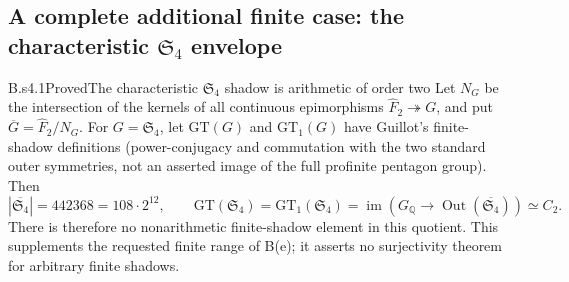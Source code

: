 \subsection{A complete additional finite case: the characteristic $\mathfrak S_4$ envelope}

\begin{claim}{B.s4.1}{Proved}{The characteristic $\mathfrak S_4$ shadow is arithmetic of order two}
Let $N_G$ be the intersection of the kernels of all continuous epimorphisms
$\widehat F_2\twoheadrightarrow G$, and put $\overline G=\widehat F_2/N_G$.
For $G=\mathfrak S_4$, let $\mathrm{GT}(G)$ and $\mathrm{GT}_1(G)$ have
Guillot's finite-shadow definitions (power-conjugacy and commutation with the
two standard outer symmetries, not an asserted image of the full profinite
pentagon group). Then
\[
 |\overline{\mathfrak S_4}|=442368=108\cdot2^{12},\qquad
 \mathrm{GT}(\mathfrak S_4)=\mathrm{GT}_1(\mathfrak S_4)
       =\operatorname{im}(G_{\mathbb Q}\to
           \operatorname{Out}(\overline{\mathfrak S_4}))\simeq C_2.
 \tag{B.s4.1.1}
\]
There is therefore no nonarithmetic finite-shadow element in this quotient.
This supplements the requested finite range of B(e); it asserts no
surjectivity theorem for arbitrary finite shadows.
\end{claim}

